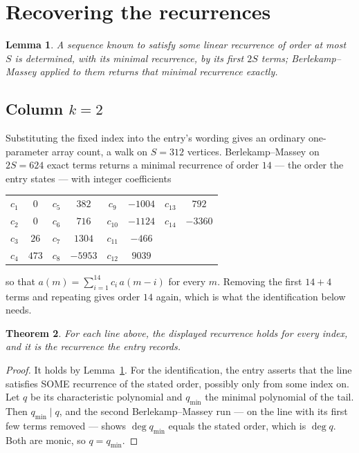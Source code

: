 \documentclass[11pt,a4paper]{article}
\theoremstyle{plain}
\newtheorem{theorem}{Theorem}
\newtheorem{lemma}[theorem]{Lemma}
\theoremstyle{definition}
\begin{document}
\section{Recovering the recurrences}

\begin{lemma}\label{lem:bm}
A sequence known to satisfy some linear recurrence of order at most $S$ is determined, with its
minimal recurrence, by its first $2S$ terms; Berlekamp--Massey applied to them returns that
minimal recurrence exactly.
\end{lemma}

\subsection*{Column $k=2$}
Substituting the fixed index into the entry's wording gives an ordinary one-parameter array
count, a walk on $S=312$ vertices. Berlekamp--Massey on $2S=624$ exact terms
returns a minimal recurrence of order $14$ --- the order the entry states --- with
integer coefficients
\begin{center}\small\begin{tabular}{cccccccc}
$c_{1}$ & $0$ & $c_{5}$ & $382$ & $c_{9}$ & $-1004$ & $c_{13}$ & $792$ \\
$c_{2}$ & $0$ & $c_{6}$ & $716$ & $c_{10}$ & $-1124$ & $c_{14}$ & $-3360$ \\
$c_{3}$ & $26$ & $c_{7}$ & $1304$ & $c_{11}$ & $-466$ &  &  \\
$c_{4}$ & $473$ & $c_{8}$ & $-5953$ & $c_{12}$ & $9039$ &  &  \\
\end{tabular}\end{center}
so that $a(m)=\sum_{i=1}^{14}c_i\,a(m-i)$ for every $m$. Removing the first
$14+4$ terms and repeating gives order $14$ again, which is what the
identification below needs.

\begin{theorem}
For each line above, the displayed recurrence holds for every index, and it is the recurrence
the entry records.
\end{theorem}

\begin{proof}
It holds by Lemma~\ref{lem:bm}. For the identification, the entry asserts that the line
satisfies SOME recurrence of the stated order, possibly only from some index on. Let $q$ be its
characteristic polynomial and $q_{\min}$ the minimal polynomial of the tail. Then
$q_{\min}\mid q$, and the second Berlekamp--Massey run --- on the line with its first few
terms removed --- shows $\deg q_{\min}$ equals the stated order, which is $\deg q$. Both are
monic, so $q=q_{\min}$.
\end{proof}
\end{document}
